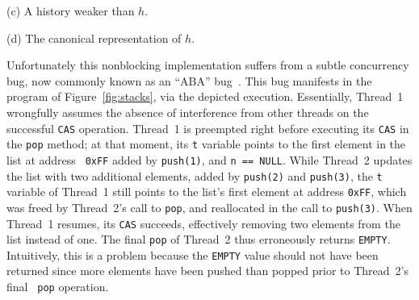 \begin{figure*}[t]
\begin{minipage}[c]{120mm}
\begin{minipage}[c]{4cm}
    \centering
    (c) A history weaker than $h$.
    \end{minipage}
    
     \bigskip
     \centering
    
    
    \smallskip
    (d) The canonical representation of $h$.
        
%    
    
  \end{minipage}
  \caption{Two implementations of a concurrent stack object, a stack-using
  program, and an execution using Treiber's stack. The {\tt pop} operation
  returns the {\tt EMPTY} when the stack is empty. The execution depicts calls,
  returns, and assignments, and time progresses downward.}
  \label{fig:stacks}
\end{figure*}

Unfortunately this nonblocking implementation suffers from a subtle concurrency
bug, now commonly known as an ``ABA'' bug~\cite{tr/ibm/Michael04}. This bug
manifests in the program of Figure~\ref{fig:stacks}, via the depicted
execution. Essentially, Thread~1 wrongfully assumes the absence of interference
from other threads on the successful {\tt CAS} operation. Thread~1 is preempted
right before executing its {\tt CAS} in the {\tt pop} method; at that moment,
its {\tt t} variable points to the first element in the list at address {\tt
0xFF} added by {\tt push(1)}, and {\tt n == NULL}. While Thread~2 updates the
list with two additional elements, added by {\tt push(2)} and {\tt push(3)},
the {\tt t} variable of Thread~1 still points to the list's first element at
address {\tt 0xFF}, which was freed by Thread~2's call to {\tt pop}, and
reallocated in the call to {\tt push(3)}. When Thread~1 resumes, its {\tt CAS}
succeeds, effectively removing two elements from the list instead of one. The
final {\tt pop} of Thread~2 thus erroneously returns {\tt EMPTY}. Intuitively,
this is a problem because the {\tt EMPTY} value should not have been returned
since more elements have been pushed than popped prior to Thread~2's final {\tt
pop} operation.

